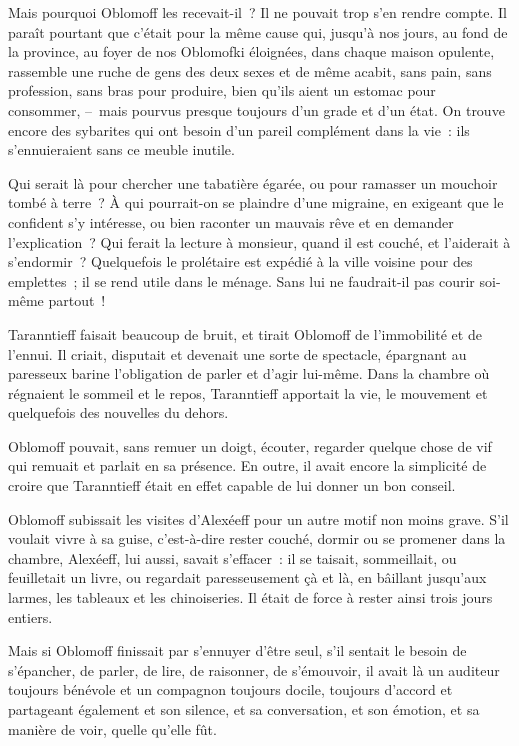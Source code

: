 \documentclass[french,twoside]{book} %
\begin{document}
Mais pourquoi Oblomoff les recevait-il ? Il ne pouvait trop s’en rendre compte. Il paraît pourtant que c’était pour la même cause qui, jusqu’à nos jours, au fond de la province, au foyer de nos Oblomofki éloignées, dans chaque maison opulente, rassemble une ruche de gens des deux sexes et de même acabit, sans pain, sans profession, sans bras pour produire, bien qu’ils aient un estomac pour consommer, – mais pourvus presque toujours d’un grade et d’un état. On trouve encore des sybarites qui ont besoin d’un pareil complément dans la vie : ils s’ennuieraient sans ce meuble inutile.\par
Qui serait là pour chercher une tabatière égarée, ou pour ramasser un mouchoir tombé à terre ? À qui pourrait-on se plaindre d’une migraine, en exigeant que le confident s’y intéresse, ou bien raconter un mauvais rêve et en demander l’explication ? Qui ferait la lecture à monsieur, quand il est couché, et l’aiderait à s’endormir ? Quelquefois le prolétaire est expédié à la ville voisine pour des emplettes ; il se rend utile dans le ménage. Sans lui ne faudrait-il pas courir soi-même partout !\par
Taranntieff faisait beaucoup de bruit, et tirait Oblomoff de l’immobilité et de l’ennui. Il criait, disputait et devenait une sorte de spectacle, épargnant au paresseux barine l’obligation de parler et d’agir lui-même. Dans la chambre où régnaient le sommeil et le repos, Taranntieff apportait la vie, le mouvement et quelquefois des nouvelles du dehors.\par
Oblomoff pouvait, sans remuer un doigt, écouter, regarder quelque chose de vif qui remuait et parlait en sa présence. En outre, il avait encore la simplicité de croire que Taranntieff était en effet capable de lui donner un bon conseil.\par
Oblomoff subissait les visites d’Alexéeff pour un autre motif non moins grave. S’il voulait vivre à sa guise, c’est-à-dire rester couché, dormir ou se promener dans la chambre, Alexéeff, lui aussi, savait s’effacer : il se taisait, sommeillait, ou feuilletait un livre, ou regardait paresseusement çà et là, en bâillant jusqu’aux larmes, les tableaux et les chinoiseries. Il était de force à rester ainsi trois jours entiers.\par
Mais si Oblomoff finissait par s’ennuyer d’être seul, s’il sentait le besoin de s’épancher, de parler, de lire, de raisonner, de s’émouvoir, il avait là un auditeur toujours bénévole et un compagnon toujours docile, toujours d’accord et partageant également et son silence, et sa conversation, et son émotion, et sa manière de voir, quelle qu’elle fût.\par
\end{document}
